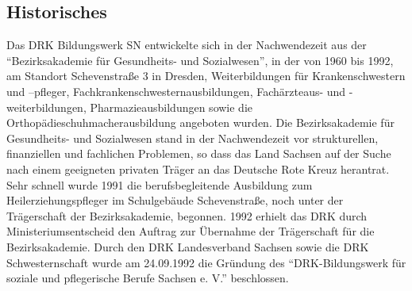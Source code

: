 \subsection{Historisches}
\label{sec:Historisches}

Das DRK Bildungswerk SN entwickelte sich in der Nachwendezeit aus der "`Bezirksakademie für Gesundheits- und Sozialwesen"', in der von 1960 bis 1992, am Standort Schevenstraße 3 in Dresden, Weiterbildungen für Krankenschwestern und –pfleger,  Fachkrankenschwesternausbildungen, Fachärzteaus- und -weiterbildungen, Pharmazieausbildungen sowie die Orthopädieschuhmacherausbildung angeboten wurden. Die Bezirksakademie für Gesundheits- und Sozialwesen stand in der Nachwendezeit vor strukturellen, finanziellen und fachlichen Problemen, so dass das Land Sachsen auf der Suche nach einem geeigneten privaten Träger an das Deutsche Rote Kreuz herantrat. Sehr schnell wurde 1991 die berufsbegleitende Ausbildung zum Heilerziehungspfleger im Schulgebäude Schevenstraße, noch unter der Trägerschaft der Bezirksakademie, begonnen. 1992 erhielt das DRK durch Ministeriumsentscheid den Auftrag zur Übernahme der Trägerschaft für die Bezirksakademie. Durch den DRK Landesverband Sachsen sowie die DRK Schwesternschaft  wurde am 24.09.1992 die Gründung des "`DRK-Bildungswerk für soziale und pflegerische Berufe Sachsen e. V."' beschlossen.  

